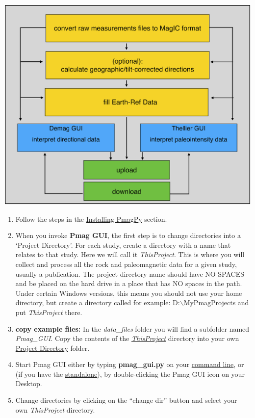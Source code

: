 \documentclass[11pt]{book}
\begin{document}
{\includegraphics[width=15cm]{EPSfiles/FigQkMagicFlow.eps}

\begin{enumerate}
\item Follow the steps in the \href{#quick_start}{Installing PmagPy} section.


\item  When you invoke {\bf Pmag GUI}, the first step is to change directories into a  `Project Directory'. For each study, create a directory with a name that relates to that study. Here we will call it {\it ThisProject}.  This is where you will collect and process all the rock and paleomagnetic data for a given study, usually a publication. The project directory name should have NO SPACES and be placed on the hard drive in a place that has NO spaces in the path. Under certain Windows versions, this means you should not use your home directory, but create a directory called for example: D:$\backslash$MyPmagProjects and put {\it ThisProject} there.
%
%
%


 \item \textbf{copy example files:}  In the {\it data\_files } folder you will find a subfolder named {\it Pmag\_GUI}. Copy the contents of the  \href{#Project_Directory}{\it ThisProject} directory  into  your  own \href{#Project_Directory}{Project Directory} folder.
 \item Start Pmag GUI either by typing {\bf pmag\_gui.py} on your \href{#command_line}{command line}, or (if you have the \href{#standalone}{standalone}), by double-clicking the Pmag GUI icon on your Desktop.
 \item Change directories by clicking  on the ``change dir'' button and select your own {\it ThisProject} directory.
 \end{enumerate}

}
\end{document}

